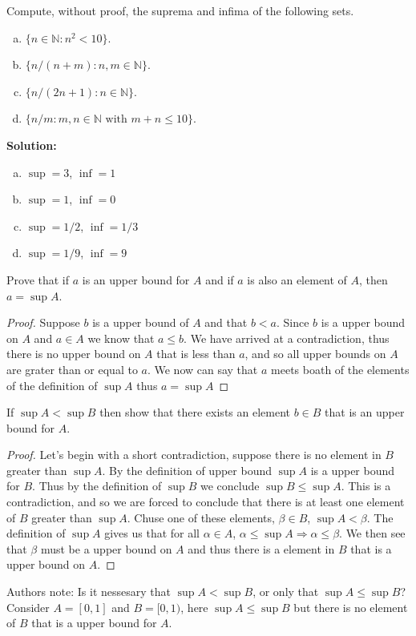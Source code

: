 \documentclass[12pt]{article}
\makeatletter
\theoremstyle{homework}
\newenvironment{exercise}[1]
{\def\@currentlabel{#1}\exercisecore}
{\endexercisecore}
\newcommand{\localhead}[1]{\par\smallskip\noindent\textbf{#1}\nobreak\\}%
\newcommand\solution{\localhead{Solution:}}
\newcommand{\Nats}{\ensuremath{\mathbb N}}
\makeatother
\begin{document}
\begin{exercise}{1.3.6} Compute, without proof, the suprema and infima of the 
following sets.
\begin{enumerate}[(a)]
\item $\{n\in\Nats: n^2<10\}$.
\item $\{n/(n+m): n,m\in\Nats\}$.
\item $\{n/(2n+1): n\in\Nats\}$.
\item $\{n/m: \text{$m,n\in\Nats$ with $m+n\le 10$}\}$.
\end{enumerate}
\end{exercise}
\solution
\begin{enumerate}[(a)]
\item $\sup=3$, $\inf=1$
\item $\sup=1$, $\inf=0$
\item $\sup=1/2$, $\inf=1/3$
\item $\sup=1/9$, $\inf=9$
\end{enumerate}

\begin{exercise}{1.3.7} Prove that if $a$ is an upper bound for $A$ and if $a$ is also an element of $A$,
then $a=\sup A$.
\end{exercise}
\begin{proof}
Suppose $b$ is a upper bound of $A$ and that $b<a$.  Since $b$ is a upper bound on $A$ and $a\in A$ we know that $a\le b$.  We have arrived at a contradiction, thus there is no upper bound on $A$ that is less than $a$, and so all upper bounds on $A$ are grater than or equal to $a$.  We now can say that $a$ meets boath of the elements of the definition of $\sup A$ thus $a=\sup A$
\end{proof}

\begin{exercise}{1.3.8}  If $\sup A < \sup B$ then show that there exists an element $b\in B$ that is an upper bound for $A$.
\end{exercise}
\begin{proof}
Let's begin with a short contradiction, suppose there is no element in $B$ greater than $\sup A$.  By the definition of upper bound $\sup A$ is a upper bound for $B$.  Thus by the definition of $\sup B$ we conclude $\sup B\le \sup A$.  This is a contradiction, and so we are forced to conclude that there is at least one element of $B$ greater than $\sup A$.  Chuse one of these elements, $\beta \in B$, $\sup A<\beta$.  The definition of $\sup A$ gives us that for all $\alpha \in A$, $\alpha\le \sup A\Rightarrow \alpha\le \beta$.  We then see that $\beta$ must be a upper bound on $A$ and thus there is a element in $B$ that is a upper bound on $A$.
\end{proof}
Authors note: Is it nessesary that $\sup A < \sup B$, or only that $\sup A \le \sup B$?  Consider $A=[0,1]$ and $B=[0,1)$, here $\sup A \le \sup B$ but there is no element of $B$ that is a upper bound for $A$.
\end{document}
